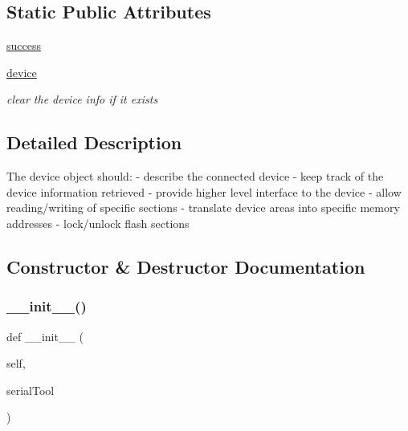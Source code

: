 \subsection*{Static Public Attributes}
\begin{DoxyCompactItemize}
\item 
\hyperlink{classstm__tools_1_1serialflasher_1_1stmdevice_1_1STMInterface_ac6ee8d13bf1e292b3c1660a66e846fa7}{success}
\item 
\hyperlink{classstm__tools_1_1serialflasher_1_1stmdevice_1_1STMInterface_adbdec58595587fea1750c91cd18315fb}{device}
\begin{DoxyCompactList}\small\item\em clear the device info if it exists \end{DoxyCompactList}\end{DoxyCompactItemize}


\subsection{Detailed Description}
\begin{DoxyVerb}The device object should:
- describe the connected device
- keep track of the device information retrieved
- provide higher level interface to the device
- allow reading/writing of specific sections
- translate device areas into specific memory addresses
- lock/unlock flash sections
\end{DoxyVerb}
 

\subsection{Constructor \& Destructor Documentation}
\mbox{\label{classstm__tools_1_1serialflasher_1_1stmdevice_1_1STMInterface_ac775ee34451fdfa742b318538164070e}} 
\subsubsection{\texorpdfstring{\+\_\+\+\_\+init\+\_\+\+\_\+()}{\_\_init\_\_()}}
{\footnotesize\ttfamily def \+\_\+\+\_\+init\+\_\+\+\_\+ (\begin{DoxyParamCaption}\item[{}]{self,  }\item[{}]{serial\+Tool }\end{DoxyParamCaption})}



